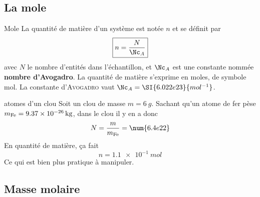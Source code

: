 \documentclass[../main/main.tex]{subfiles}
\begin{document}
\subsection{La mole}


\begin{tcbraster}[raster columns=2, raster equal height=rows]
    \begin{defi}[label=def:mole]{Mole}
        La quantité de matière d'un système est notée $n$ et se définit par
        \[\boxed{n = \frac{N}{\Nc_A}}\]
        avec $N$ le nombre d'entités dans l'échantillon, et $\Nc_A$ est une
        constante nommée \textbf{nombre d'Avogadro}.
        La quantité de matière s'exprime en moles, de symbole mol. La constante
        d'\textsc{Avogadro} vaut $\Nc_A = \SI{6.022e23}{mol^{-1}}$.
    \end{defi}
    \begin{exem}[label=exem:nbat]{atomes d'un clou}
        Soit un clou de masse $m = \SI{6}{g}$. Sachant qu'un atome de fer pèse
        $m_{\rm Fe} = \SI{9.37e-26}{kg}$, dans le clou il y en a donc
        \[N = \frac{m}{m_{\rm Fe}} = \num{6.4e22}\]
        En quantité de matière, ça fait
        \[ n = \SI{1.1e-1}{mol}\]
        Ce qui est bien plus pratique à manipuler.
    \end{exem}
\end{tcbraster}

\subsection{Masse molaire}
\end{document}
